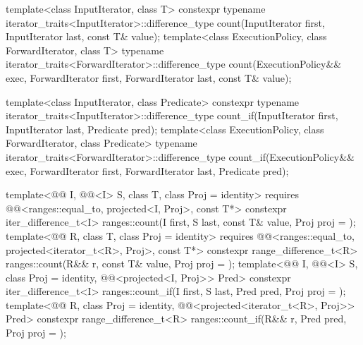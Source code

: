 %
%
\begin{itemdecl}
template<class InputIterator, class T>
  constexpr typename iterator_traits<InputIterator>::difference_type
    count(InputIterator first, InputIterator last, const T& value);
template<class ExecutionPolicy, class ForwardIterator, class T>
  typename iterator_traits<ForwardIterator>::difference_type
    count(ExecutionPolicy&& exec,
          ForwardIterator first, ForwardIterator last, const T& value);

template<class InputIterator, class Predicate>
  constexpr typename iterator_traits<InputIterator>::difference_type
    count_if(InputIterator first, InputIterator last, Predicate pred);
template<class ExecutionPolicy, class ForwardIterator, class Predicate>
  typename iterator_traits<ForwardIterator>::difference_type
    count_if(ExecutionPolicy&& exec,
             ForwardIterator first, ForwardIterator last, Predicate pred);

template<@@ I, @@<I> S, class T, class Proj = identity>
  requires @@<ranges::equal_to, projected<I, Proj>, const T*>
  constexpr iter_difference_t<I>
    ranges::count(I first, S last, const T& value, Proj proj = {});
template<@@ R, class T, class Proj = identity>
  requires @@<ranges::equal_to, projected<iterator_t<R>, Proj>, const T*>
  constexpr range_difference_t<R>
    ranges::count(R&& r, const T& value, Proj proj = {});
template<@@ I, @@<I> S, class Proj = identity,
         @@<projected<I, Proj>> Pred>
  constexpr iter_difference_t<I>
    ranges::count_if(I first, S last, Pred pred, Proj proj = {});
template<@@ R, class Proj = identity,
         @@<projected<iterator_t<R>, Proj>> Pred>
  constexpr range_difference_t<R>
    ranges::count_if(R&& r, Pred pred, Proj proj = {});
\end{itemdecl}

